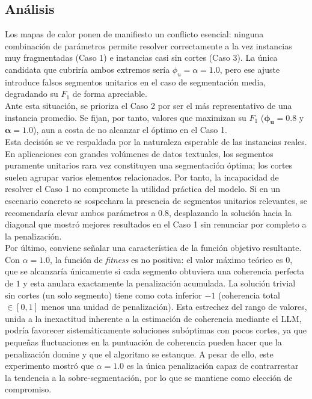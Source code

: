 \documentclass[letterpaper, 12pt]{report}
\begin{document}
\subsection{Análisis}

Los mapas de calor ponen de manifiesto un conflicto esencial: ninguna combinación de parámetros permite resolver correctamente a la vez instancias muy fragmentadas (Caso 1) e instancias casi sin cortes (Caso 3). La única candidata que cubriría ambos extremos sería \(\phi_u = \alpha = 1.0\), pero ese ajuste introduce falsos segmentos unitarios en el caso de segmentación media, degradando su \(F_1\) de forma apreciable. \\

Ante esta situación, se prioriza el Caso 2 por ser el más representativo de una instancia promedio. Se fijan, por tanto, valores que maximizan su \(F_1\) (\(\boldsymbol{\phi_u} = \mathbf{0.8}\) y \(\boldsymbol{\alpha} = \mathbf{1.0}\)), aun a costa de no alcanzar el óptimo en el Caso 1. \\

Esta decisión se ve respaldada por la naturaleza esperable de las instancias reales. En aplicaciones con grandes volúmenes de datos textuales, los segmentos puramente unitarios rara vez constituyen una segmentación óptima; los cortes suelen agrupar varios elementos relacionados. Por tanto, la incapacidad de resolver el Caso 1 no compromete la utilidad práctica del modelo. Si en un escenario concreto se sospechara la presencia de segmentos unitarios relevantes, se recomendaría elevar ambos parámetros a \(0.8\), desplazando la solución hacia la diagonal que mostró mejores resultados en el Caso 1 sin renunciar por completo a la penalización. \\

Por último, conviene señalar una característica de la función objetivo resultante. Con \(\alpha = 1.0\), la función de \textit{fitness} es no positiva: el valor máximo teórico es \(0\), que se alcanzaría únicamente si cada segmento obtuviera una coherencia perfecta de \(1\) y esta anulara exactamente la penalización acumulada. La solución trivial sin cortes (un solo segmento) tiene como cota inferior \(-1\) (coherencia total \(\in [0,1]\) menos una unidad de penalización). Esta estrechez del rango de valores, unida a la inexactitud inherente a la estimación de coherencia mediante el LLM, podría favorecer sistemáticamente soluciones subóptimas con pocos cortes, ya que pequeñas fluctuaciones en la puntuación de coherencia pueden hacer que la penalización domine y que el algoritmo se estanque. A pesar de ello, este experimento mostró que \(\alpha = 1.0\) es la única penalización capaz de contrarrestar la tendencia a la sobre‑segmentación, por lo que se mantiene como elección de compromiso.
\end{document}
